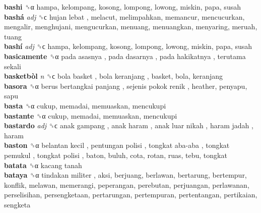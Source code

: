 \textbf{bashi} ␝α  hampa, kelompang, kosong, lompong, lowong, miskin, papa, susah  \\
\textbf{bashá} \emph{adj}  ␝ϲ   hujan lebat , melacut, melimpahkan, memancur, mencucurkan, mengalir, menghujani, mengucurkan, menuang, menuangkan, menyaring, meruah, tuang  \\
\textbf{bashí} \emph{adj}  ␝ϲ  hampa, kelompang, kosong, lompong, lowong, miskin, papa, susah  \\
\textbf{basicamente} ␝α   pada asasnya ,  pada dasarnya ,  pada hakikatnya ,  terutama sekali   \\
\textbf{basketbòl} \emph{n}  ␝ϲ   bola basket ,  bola keranjang , basket, bola, keranjang  \\
\textbf{basora} ␝α   berus bertangkai panjang ,  sejenis pokok renik , heather, penyapu, sapu  \\
\textbf{basta} ␝α  cukup, memadai, memuaskan, mencukupi  \\
\textbf{bastante} ␝α  cukup, memadai, memuaskan, mencukupi  \\
\textbf{bastardo} \emph{adj}  ␝ϲ   anak gampang ,  anak haram ,  anak luar nikah ,  haram jadah , haram  \\
\textbf{baston} ␝α   belantan kecil ,  pentungan polisi ,  tongkat aba-aba ,  tongkat pemukul ,  tongkat polisi , baton, buluh, cota, rotan, ruas, tebu, tongkat  \\
\textbf{batata} ␝α   kacang tanah   \\
\textbf{bataya} ␝α   tindakan militer , aksi, berjuang, berlawan, bertarung, bertempur, konflik, melawan, memerangi, peperangan, perebutan, perjuangan, perlawanan, perselisihan, persengketaan, pertarungan, pertempuran, pertentangan, pertikaian, sengketa  \\
